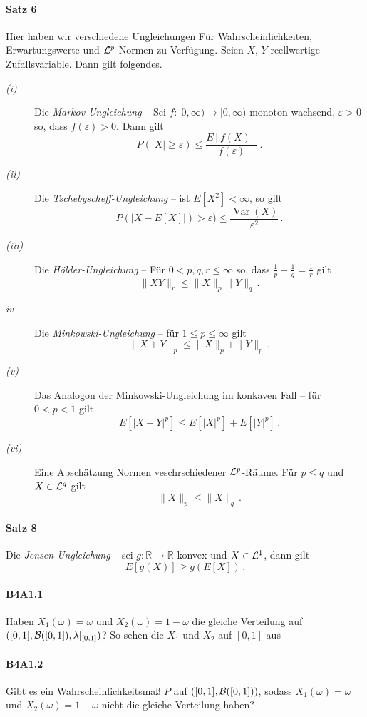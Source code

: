 \documentclass{article}
\begin{document}
\paragraph{Satz 6} Hier haben wir verschiedene Ungleichungen Für Wahrscheinlichkeiten, Erwartungswerte und ${\cal L}^p$-Normen zu Verfügung.
Seien $X$, $Y$ reellwertige Zufallsvariable.
Dann gilt folgendes.
\begin{description}
\item[\emph{(i)}] Die \emph{Markov-Ungleichung} -- Sei $f\colon[0,\infty)\to[0,\infty)$ monoton wachsend, $\varepsilon>0$ so, dass $f(\varepsilon)>0$.
  Dann gilt
  \[P(|X|\geq\varepsilon)\leq\frac{E[f(X)]}{f(\varepsilon)}\,.\]
\item[\emph{(ii)}] Die \emph{Tschebyscheff-Ungleichung} -- ist $E[X^2]<\infty$, so gilt
  \[P(|X-E[X]|)>\varepsilon)\leq\frac{\operatorname{Var}(X)}{\varepsilon^2}\,.\]
\item[\emph{(iii)}] Die \emph{Hölder-Ungleichung} -- Für $0<p,q,r\leq\infty$ so, dass $\frac{1}{p}+\frac{1}{q}=\frac{1}{r}$ gilt
  \[\|XY\|_r\leq\|X\|_p\|Y\|_q\,.\]
\item[\emph{iv}] Die \emph{Minkowski-Ungleichung} -- für $1\leq p\leq\infty$ gilt
  \[\|X+Y\|_p\leq\|X\|_p+\|Y\|_p\,.\]
\item[\emph{(v)}] Das Analogon der Minkowski-Ungleichung im konkaven Fall -- für $0<p<1$ gilt
  \[E[|X+Y|^p]\leq E[|X|^p]+E[|Y|^p]\,.\]
\item[\emph{(vi)}] Eine Abschätzung Normen veschrschiedener ${\cal L}^p$-Räume. Für $p\leq q$ und $X\in{\cal L}^q$ gilt
  \[\|X\|_p\leq\|X\|_q\,.\]
\end{description}
\paragraph{Satz 8} Die \emph{Jensen-Ungleichung} -- sei $g\colon\mathbb{R}\to\mathbb{R}$ konvex und $X\in{\cal L}^1$, dann gilt
\[E[g(X)]\geq g(E[X])\,.\]

\paragraph{B4A1.1}
Haben $X_1(\omega)=\omega$ und $X_2(\omega)=1-\omega$ die gleiche Verteilung auf $([0,1],{\cal B}([0,1]),\lambda|_{[0,1]})$?
So sehen die $X_1$ und $X_2$ auf $[0,1]$ aus
\paragraph{B4A1.2}
Gibt es ein Wahrscheinlichkeitsmaß $P$ auf $([0,1],{\cal B}([0,1]))$, sodass $X_1(\omega)=\omega$ und $X_2(\omega)=1-\omega$ nicht die gleiche Verteilung haben?
\end{document}
